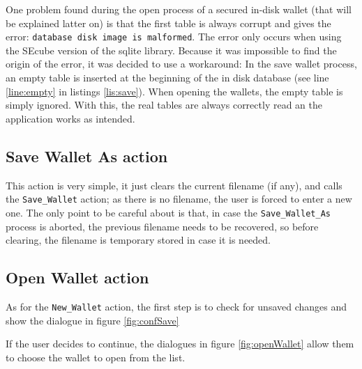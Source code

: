 One problem found during the open process of a secured in-disk wallet (that will be explained latter on) is that the first table is always corrupt and gives the error: \texttt{database disk image is malformed}. The error only occurs when using the SEcube version of the sqlite library. Because it was impossible to find the origin of the error, it was decided to use a workaround: In the save wallet process, an empty table is inserted at the beginning of the in disk database (see line \ref{line:empty} in listings \ref{lis:save}). When opening the wallets, the empty table is simply ignored. With this, the real tables are always correctly read an the application works as intended.


\subsection{Save Wallet As action}

This action is very simple, it just clears the current filename (if any), and calls the \texttt{Save\_Wallet} action; as there is no filename, the user is forced to enter a new one. The only point to be careful about is that, in case the \texttt{Save\_Wallet\_As} process is aborted, the previous filename needs to be recovered, so before clearing, the filename is temporary stored in case it is needed.

\subsection{Open Wallet action}
As for the \texttt{New\_Wallet} action, the first step is to check for unsaved changes and show the dialogue in figure \ref{fig:confSave}

If the user decides to continue, the dialogues in figure \ref{fig:openWallet} allow them to choose the wallet to open from the list.

